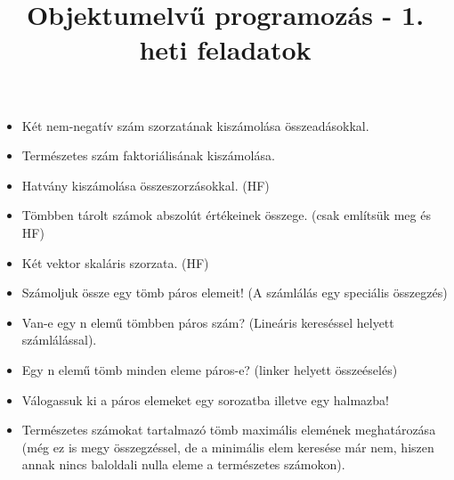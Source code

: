 \documentclass[12pt,a4paper]{article}
\title{Objektumelvű programozás - 1. heti feladatok}
\begin{document}
\maketitle

\begin{itemize}
\item Két nem-negatív szám szorzatának kiszámolása összeadásokkal.
\item Természetes szám faktoriálisának kiszámolása.
\item Hatvány kiszámolása összeszorzásokkal. (HF)
\item Tömbben tárolt számok abszolút értékeinek összege. (csak említsük meg és HF)
\item Két vektor skaláris szorzata. (HF)
\item Számoljuk össze egy tömb páros elemeit! (A számlálás egy speciális összegzés)
\item Van-e egy n elemű tömbben páros szám? (Lineáris kereséssel helyett számlálással).
\item Egy n elemű tömb minden eleme páros-e? (linker helyett összeéselés)
\item Válogassuk ki a páros elemeket egy sorozatba illetve egy halmazba!
\item Természetes számokat tartalmazó tömb maximális elemének meghatározása (még ez
is megy összegzéssel, de a minimális elem keresése már nem, hiszen annak nincs
baloldali nulla eleme a természetes számokon).
\end{itemize}
\end{document}
